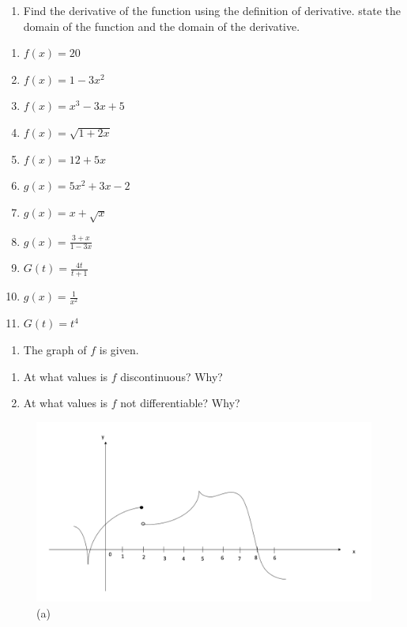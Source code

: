 \documentclass[]{book}
\providecommand{\tightlist}{%
  \setlength{\itemsep}{0pt}\setlength{\parskip}{0pt}}
\begin{document}
\begin{enumerate}
\def\labelenumi{\arabic{enumi}.}
\setcounter{enumi}{1}
\tightlist
\item
  Find the derivative of the function using the definition of derivative. state the domain of the function and the domain of the derivative.
\end{enumerate}

\begin{enumerate}
\def\labelenumi{(\alph{enumi})}
\tightlist
\item
  \(f(x) = 20\)
\item
  \(f(x) = 1-3x^2\)
\item
  \(f(x) = x^3 -3x+5\)
\item
  \(f(x) = \sqrt{1+2x}\)
\item
  \(f(x) = 12+5x\)
\item
  \(g(x) = 5x^2+3x-2\)
\item
  \(g(x) = x+\sqrt{x}\)
\item
  \(g(x) = \frac{3+x}{1-3x}\)
\item
  \(G(t) = \frac{4t}{t+1}\)
\item
  \(g(x) = \frac{1}{x^2}\)
\item
  \(G(t) = t^4\)
\end{enumerate}

\begin{enumerate}
\def\labelenumi{\arabic{enumi}.}
\setcounter{enumi}{2}
\tightlist
\item
  The graph of \(f\) is given.
\end{enumerate}

\begin{enumerate}
\def\labelenumi{(\roman{enumi})}
\tightlist
\item
  At what values is \(f\) discontinuous? Why?
\item
  At what values is \(f\) not differentiable? Why?
\end{enumerate}

\begin{figure}

{\centering \includegraphics[width=0.7\linewidth]{figure/5Derivatives-9} 

}

\caption{(a)}\label{fig:p1}
\end{figure}
\end{document}
